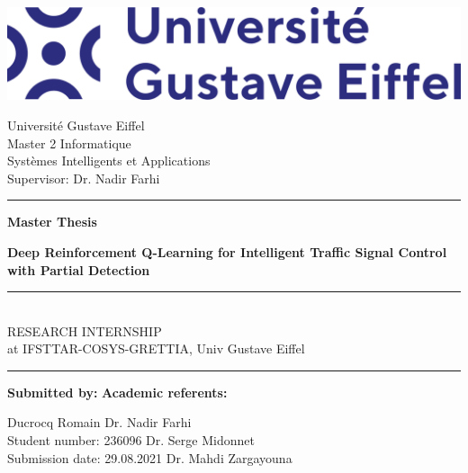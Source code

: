 
\begin{titlepage}
\begin{center}

\includegraphics[width=\textwidth]{img/logo_uge.png}
\vspace{0.3cm}

\large{Université Gustave Eiffel} \\
\large{Master 2 Informatique} \\
\large{Systèmes Intelligents et Applications} \\
\large{Supervisor: Dr. Nadir Farhi} \\

\vspace{1cm}
\noindent\rule{\textwidth}{1.5pt}
\vspace{0.3cm}

\LARGE{\textbf{Master Thesis}} \\ %

\vspace{1cm}

\LARGE{\textbf{Deep Reinforcement Q-Learning for Intelligent Traffic Signal Control with Partial Detection}} \\
\noindent\rule{0.5cm}{0.7pt} \\
\Large{RESEARCH INTERNSHIP \\ 
at IFSTTAR-COSYS-GRETTIA, Univ Gustave Eiffel}

\vspace{0.3cm}
\noindent\rule{\textwidth}{1.5pt}
\vspace{1cm}
\end{center}

\noindent\normalsize{\textbf{Submitted by:}} \hfill \normalsize{\textbf{Academic referents:}}

\vspace{0.5cm}

\noindent\normalsize{Ducrocq Romain} \hfill \normalsize{Dr. Nadir Farhi} \\
\normalsize{Student number: 236096} \hfill \normalsize{Dr. Serge Midonnet} \\
\normalsize{Submission date: 29.08.2021} \hfill \normalsize{Dr. Mahdi Zargayouna} \\
\end{titlepage}

\restoregeometry %
